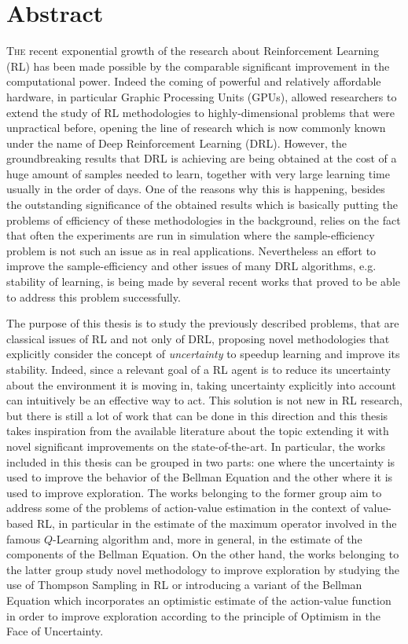 \chapter*{Abstract}
\lettrine{T}{he} recent exponential growth of the research about Reinforcement Learning (RL) has been made possible by the comparable significant improvement in the computational power. Indeed the coming of powerful and relatively affordable hardware, in particular Graphic Processing Units (GPUs), allowed researchers to extend the study of RL methodologies to highly-dimensional problems that were unpractical before, opening the line of research which is now commonly known under the name of Deep Reinforcement Learning (DRL). However, the groundbreaking results that DRL is achieving are being obtained at the cost of a huge amount of samples needed to learn, together with very large learning time usually in the order of days. One of the reasons why this is happening, besides the outstanding significance of the obtained results which is basically putting the problems of efficiency of these methodologies in the background, relies on the fact that often the experiments are run in simulation where the sample-efficiency problem is not such an issue as in real applications. Nevertheless an effort to improve the sample-efficiency and other issues of many DRL algorithms, e.g. stability of learning, is being made by several recent works that proved to be able to address this problem successfully.

The purpose of this thesis is to study the previously described problems, that are classical issues of RL and not only of DRL, proposing novel methodologies that explicitly consider the concept of \textit{uncertainty} to speedup learning and improve its stability. Indeed, since a relevant goal of a RL agent is to reduce its uncertainty about the environment it is moving in, taking uncertainty explicitly into account can intuitively be an effective way to act. This solution is not new in RL research, but there is still a lot of work that can be done in this direction and this thesis takes inspiration from the available literature about the topic extending it with novel significant improvements on the state-of-the-art. In particular, the works included in this thesis can be grouped in two parts: one where the uncertainty is used to improve the behavior of the Bellman Equation and the other where it is used to improve exploration. The works belonging to the former group aim to address some of the problems of action-value estimation in the context of value-based RL, in particular in the estimate of the maximum operator involved in the famous $Q$-Learning algorithm and, more in general, in the estimate of the components of the Bellman Equation. On the other hand, the works belonging to the latter group study novel methodology to improve exploration by studying the use of Thompson Sampling in RL or introducing a variant of the Bellman Equation which incorporates an optimistic estimate of the action-value function in order to improve exploration according to the principle of Optimism in the Face of Uncertainty.

